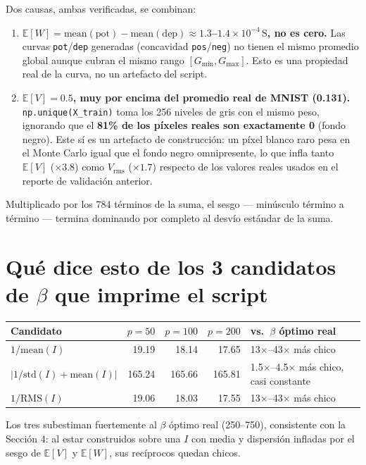\documentclass[11pt]{article}
\begin{document}
Dos causas, ambas verificadas, se combinan:
\begin{enumerate}
\item \textbf{$\mathbb{E}[W]=\mathrm{mean(pot)}-\mathrm{mean(dep)}\approx1.3$--$1.4\times10^{-4}\,\mathrm{S}$,
  no es cero.} Las curvas \texttt{pot}/\texttt{dep} generadas (concavidad
  \texttt{pos}/\texttt{neg}) no tienen el mismo promedio global aunque
  cubran el mismo rango $[G_{\min},G_{\max}]$. Esto es una propiedad real
  de la curva, no un artefacto del script.
\item \textbf{$\mathbb{E}[V]=0.5$, muy por encima del promedio real de
  MNIST (0.131).} \texttt{np.unique(X\_train)} toma los 256 niveles de
  gris con el mismo peso, ignorando que el \textbf{81\% de los píxeles
  reales son exactamente 0} (fondo negro). Este sí es un artefacto de
  construcción: un píxel blanco raro pesa en el Monte Carlo igual que el
  fondo negro omnipresente, lo que infla tanto $\mathbb{E}[V]$
  ($\times3.8$) como $V_{\mathrm{rms}}$ ($\times1.7$) respecto de los
  valores reales usados en el reporte de validación anterior.
\end{enumerate}

Multiplicado por los 784 términos de la suma, el sesgo --- minúsculo
término a término --- termina dominando por completo al desvío estándar de
la suma.

\section{Qué dice esto de los 3 candidatos de $\beta$ que imprime el script}

\begin{table}[htbp]
\centering
\small
\begin{tabular}{@{}lrrrl@{}}
\toprule
Candidato & $p=50$ & $p=100$ & $p=200$ & vs.\ $\beta$ óptimo real \\
\midrule
$1/\mathrm{mean}(I)$ & 19.19 & 18.14 & 17.65 & 13$\times$--43$\times$ más chico \\
$|1/\mathrm{std}(I)+\mathrm{mean}(I)|$ & 165.24 & 165.66 & 165.81 & 1.5$\times$--4.5$\times$ más chico, casi constante \\
$1/\mathrm{RMS}(I)$ & 19.06 & 18.03 & 17.55 & 13$\times$--43$\times$ más chico \\
\bottomrule
\end{tabular}
\end{table}

Los tres subestiman fuertemente al $\beta$ óptimo real (250--750),
consistente con la Sección 4: al estar construidos sobre una $I$ con media
y dispersión infladas por el sesgo de $\mathbb{E}[V]$ y $\mathbb{E}[W]$,
sus recíprocos quedan chicos.
\end{document}
